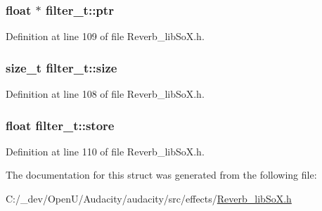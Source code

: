 \subsubsection[{\texorpdfstring{ptr}{ptr}}]{\setlength{\rightskip}{0pt plus 5cm}float $\ast$ filter\+\_\+t\+::ptr}\hypertarget{structfilter__t_ae8a9183f8d7e1c4b3af047ec0f256459}{}\label{structfilter__t_ae8a9183f8d7e1c4b3af047ec0f256459}


Definition at line 109 of file Reverb\+\_\+lib\+So\+X.\+h.

\subsubsection[{\texorpdfstring{size}{size}}]{\setlength{\rightskip}{0pt plus 5cm}size\+\_\+t filter\+\_\+t\+::size}\hypertarget{structfilter__t_a67a88c7d6a8eb2642661b22e552a45cb}{}\label{structfilter__t_a67a88c7d6a8eb2642661b22e552a45cb}


Definition at line 108 of file Reverb\+\_\+lib\+So\+X.\+h.

\subsubsection[{\texorpdfstring{store}{store}}]{\setlength{\rightskip}{0pt plus 5cm}float filter\+\_\+t\+::store}\hypertarget{structfilter__t_a6c6fadd221d1195296f71720c9fa4d73}{}\label{structfilter__t_a6c6fadd221d1195296f71720c9fa4d73}


Definition at line 110 of file Reverb\+\_\+lib\+So\+X.\+h.



The documentation for this struct was generated from the following file\+:\begin{DoxyCompactItemize}
\item 
C\+:/\+\_\+dev/\+Open\+U/\+Audacity/audacity/src/effects/\hyperlink{_reverb__lib_so_x_8h}{Reverb\+\_\+lib\+So\+X.\+h}\end{DoxyCompactItemize}
